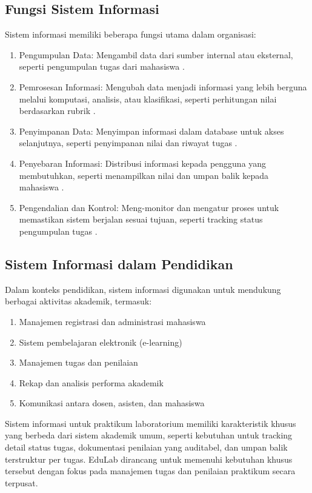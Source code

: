 \documentclass[12pt,a4paper,twoside]{report}
\begin{document}
\subsection{Fungsi Sistem Informasi}
Sistem informasi memiliki beberapa fungsi utama dalam organisasi:

\begin{enumerate}
    \item Pengumpulan Data: Mengambil data dari sumber internal atau eksternal, seperti pengumpulan tugas dari mahasiswa \cite{laudon2016}.
    \item Pemrosesan Informasi: Mengubah data menjadi informasi yang lebih berguna melalui komputasi, analisis, atau klasifikasi, seperti perhitungan nilai berdasarkan rubrik \cite{stair2018}.
    \item Penyimpanan Data: Menyimpan informasi dalam database untuk akses selanjutnya, seperti penyimpanan nilai dan riwayat tugas \cite{laudon2016}.
    \item Penyebaran Informasi: Distribusi informasi kepada pengguna yang membutuhkan, seperti menampilkan nilai dan umpan balik kepada mahasiswa \cite{stair2018}.
    \item Pengendalian dan Kontrol: Meng-monitor dan mengatur proses untuk memastikan sistem berjalan sesuai tujuan, seperti tracking status pengumpulan tugas \cite{laudon2016}.
\end{enumerate}

\subsection{Sistem Informasi dalam Pendidikan}

Dalam konteks pendidikan, sistem informasi digunakan untuk mendukung berbagai aktivitas akademik, termasuk:

\begin{enumerate}
    \item Manajemen registrasi dan administrasi mahasiswa \cite{bourgeois2014}
    \item Sistem pembelajaran elektronik (e-learning) \cite{alfraihat2020}
    \item Manajemen tugas dan penilaian \cite{bourgeois2014}
    \item Rekap dan analisis performa akademik \cite{bourgeois2014}
    \item Komunikasi antara dosen, asisten, dan mahasiswa \cite{adekunle2024}
\end{enumerate}

Sistem informasi untuk praktikum laboratorium memiliki karakteristik khusus yang berbeda dari sistem akademik umum, seperti kebutuhan untuk tracking detail status tugas, dokumentasi penilaian yang auditabel, dan umpan balik terstruktur per tugas. EduLab dirancang untuk memenuhi kebutuhan khusus tersebut dengan fokus pada manajemen tugas dan penilaian praktikum secara terpusat.
\end{document}
